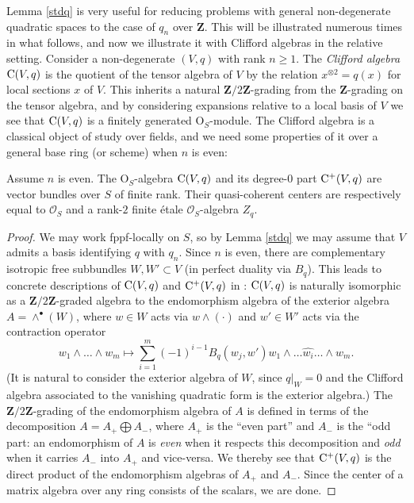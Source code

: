 \documentclass[10pt]{article}
\renewcommand{\O}{\mathscr{O}}
\renewcommand{\(}{\left(}
\renewcommand{\)}{\right)}
\renewcommand{\O}{\mathrm{O}}
\numberwithin{thm}{subsection}
\begin{document}
 Lemma \ref{stdq} is very useful for reducing problems with general non-degenerate
 quadratic spaces to the case of $q_n$ over ${\mathbf{Z}}$.
 This will be illustrated numerous times in what follows, and now we illustrate it
with Clifford algebras in the relative setting.
Consider a non-degenerate $(V,q)$
with rank $n \ge 1$.  The {\em Clifford algebra} 
${\rm{C}}(V,q)$ is the quotient of the tensor algebra of
$V$ by the relation $x^{\otimes 2} = q(x)$
for local sections $x$ of $V$.   This inherits a natural 
${\mathbf{Z}}/2{\mathbf{Z}}$-grading from the ${\mathbf{Z}}$-grading on the tensor algebra,
and by considering expansions relative to a local basis
of $V$ we see that ${\rm{C}}(V,q)$ is a finitely generated
$\O_S$-module.  The Clifford
algebra is a classical object of study over fields, and
we need some properties of it over a general base ring
(or scheme) when $n$ is even: 

\begin{lem} Assume $n$ is even. The $\O_S$-algebra 
${\rm{C}}(V,q)$ and its degree-$0$ part ${\rm{C}}^+(V,q)$
are vector bundles over $S$ of finite rank.  Their 
quasi-coherent centers are respectively equal to 
$\mathscr{O}_S$ and a rank-$2$ finite \'etale $\mathscr{O}_S$-algebra $Z_q$.
\end{lem}

\begin{proof} We may work fppf-locally on $S$, 
so by Lemma \ref{stdq} we may assume that $V$ admits a basis identifying
$q$ with $q_n$. Since $n$ is even, there are complementary isotropic free subbundles
$W, W' \subset V$ (in perfect duality via $B_q$).
This leads to concrete descriptions of ${\rm{C}}(V,q)$
and ${\rm{C}}^+(V,q)$ in \cite[XII, 1.4]{sga7}:
${\rm{C}}(V,q)$ is naturally isomorphic as a ${\mathbf{Z}}/2{\mathbf{Z}}$-graded algebra to the 
endomorphism algebra of the  exterior algebra $A = \wedge^{\bullet}(W)$,
where $w \in W$ acts via $w \wedge (\cdot)$
and $w' \in W'$ acts via the contraction operator
$$w_1 \wedge \dots \wedge w_m \mapsto  \sum_{i=1}^m (-1)^{i-1}  B_q(w_j,w')
w_1 \wedge \dots \widehat{w_i} \dots \wedge w_m.$$
(It is natural to consider the exterior algebra of $W$, since $q|_W = 0$
and the Clifford algebra associated to the vanishing quadratic form is the exterior algebra.)
The ${\mathbf{Z}}/2{\mathbf{Z}}$-grading of the endomorphism
algebra of $A$ is defined in terms of
the decomposition $A = A_{+} \bigoplus A_{-}$, where $A_{+}$ is
the ``even part'' and $A_{-}$ is the ``odd part:
an endomorphism of $A$ is {\em even} when
it respects this decomposition and {\em odd} when it carries
$A_{-}$ into $A_{+}$ and vice-versa.  
We thereby see that ${\rm{C}}^+(V,q)$ is the direct product of the endomorphism
algebras of $A_{+}$ and $A_{-}$.  Since the center of a matrix
algebra over any ring consists of the scalars, we are done.
\end{proof}
\end{document}
